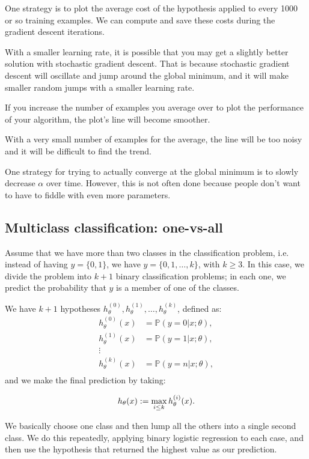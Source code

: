 \documentclass[a4paper,11pt]{report}
\begin{document}
One strategy is to plot the average cost of the hypothesis applied to every 1000 or so training examples. We can compute and save these costs during the gradient descent iterations.

With a smaller learning rate, it is possible that you may get a slightly better solution with stochastic gradient descent. That is because stochastic gradient descent will oscillate and jump around the global minimum, and it will make smaller random jumps with a smaller learning rate.

If you increase the number of examples you average over to plot the performance of your algorithm, the plot's line will become smoother.

With a very small number of examples for the average, the line will be too noisy and it will be difficult to find the trend.

One strategy for trying to actually converge at the global minimum is to slowly decrease $\alpha$ over time. However, this is not often done because people don't want to have to fiddle with even more parameters.

\subsection*{Multiclass classification: one-vs-all}

Assume that we have more than two classes in the classification problem, i.e. instead of having $y = \{0,1\}$, we have $y = \{0,1, \ldots, k\}$, with $k \geq 3$.
In this case, we divide the problem into $k+1$ binary classification problems; in each one, we predict the probability that $y$ is a member of one of the classes.

We have $k+1$ hypotheses $h_\theta^{(0)}, h_\theta^{(1)}, \ldots, h_\theta^{(k)}$, defined as:
\begin{align*}
h_\theta^{(0)}(x) &= \mathbb{P}(y = 0 | x ; \theta), \\
h_\theta^{(1)}(x) &= \mathbb{P}(y = 1 | x ; \theta), \\
\vdots &\\
h_\theta^{(k)}(x) &= \mathbb{P}(y = n | x ; \theta), \\
\end{align*}
and we make the final prediction by taking:

$$h_\theta(x) := \max_{i\leq k} h_\theta ^{(i)}(x). \\$$

We basically choose one class and then lump all the others into a single second class. We do this repeatedly, applying binary logistic regression to each case, and then use the hypothesis that returned the highest value as our prediction.
\end{document}
